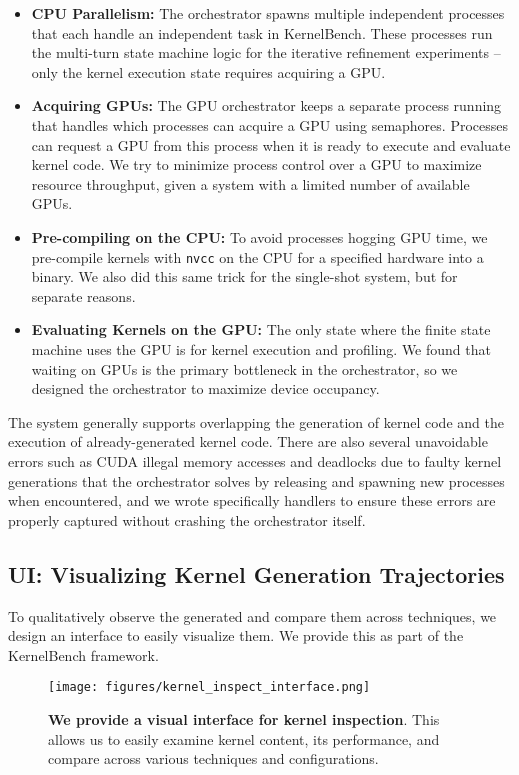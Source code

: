 \begin{itemize}
    \item \textbf{CPU Parallelism:} The orchestrator spawns multiple independent processes that each handle an independent task in KernelBench. These processes run the multi-turn state machine logic for the iterative refinement experiments -- only the kernel execution state requires acquiring a GPU.
    \item \textbf{Acquiring GPUs:} The GPU orchestrator keeps a separate process running that handles which processes can acquire a GPU using semaphores. Processes can request a GPU from this process when it is ready to execute and evaluate kernel code. We try to minimize process control over a GPU to maximize resource throughput, given a system with a limited number of available GPUs.
    \item \textbf{Pre-compiling on the CPU:} To avoid processes hogging GPU time, we pre-compile kernels with \texttt{nvcc} on the CPU for a specified hardware into a binary. We also did this same trick for the single-shot system, but for separate reasons.
    \item \textbf{Evaluating Kernels on the GPU:} The only state where the finite state machine uses the GPU is for kernel execution and profiling. We found that waiting on GPUs is the primary bottleneck in the orchestrator, so we designed the orchestrator to maximize device occupancy.
\end{itemize}

\noindent The system generally supports overlapping the generation of kernel code and the execution of already-generated kernel code. There are also several unavoidable errors such as CUDA illegal memory accesses and deadlocks due to faulty kernel generations that the orchestrator solves by releasing and spawning new processes when encountered, and we wrote specifically handlers to ensure these errors are properly captured without crashing the orchestrator itself.

\subsection{UI: Visualizing Kernel Generation Trajectories}

To qualitatively observe the generated and compare them across techniques, we design an interface to easily visualize them. We provide this as part of the KernelBench framework. 


\begin{figure}[h]
    \centering
    \texttt{[image: figures/kernel\_inspect\_interface.png]}
    \caption{\textbf{We provide a visual interface for kernel inspection}. This allows us to easily examine kernel content, its performance, and compare across various techniques and configurations.}
    \label{fig:kernel_inspect}
\end{figure}